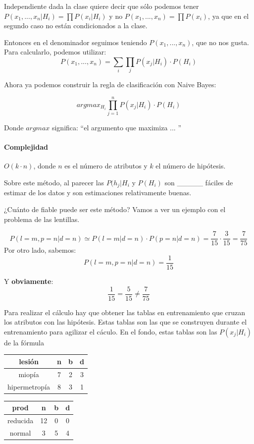 \documentclass{apuntes}
\begin{document}
Independiente dada la clase quiere decir que sólo podemos tener 
$P(x_1,...,x_n | H_i) = \prod{P(x_i | H_i)}$ y no $P(x_1,...,x_n) = \prod{P(x_i)}$, ya que en el segundo caso no están condicionados a la clase.

Entonces en el denominador seguimos teniendo $P(x_1,...,x_n)$, que no nos gusta. Para calcularlo, podemos utilizar: 
\[
P(x_1,...,x_n) = \sum_i \prod_j P(x_j | H_i) · P(H_i)
\]

Ahora ya podemos construir la regla de clasificación con Naive Bayes:

\begin{defn}
\begin{mdframed}
	\[
		argmax_{H_i} \prod_{j=1}^n P(x_j|H_i) · P(H_i)
	\]
\end{mdframed}
Donde $argmax$ significa: ``el argumento que maximiza ... ''

\paragraph{Complejidad} $O(k·n)$, donde $n$ es el número de atributos y $k$ el número de hipótesis.


Sobre este método, al parecer las $P(h_j|H_i$ y $P(H_i)$ son \_\_\_\_\_ fáciles de estimar de los datos y son estimaciones relativamente buenas.
\end{defn}

\begin{example}
¿Cuánto de fiable puede ser este método? Vamos a ver un ejemplo con el problema de las lentillas.

\[
P(l=m,p=n | d=n) \simeq P(l=m | d=n) · P(p=n | d=n) = \frac{7}{15}·\frac{3}{15} = \frac{7}{75} 
\]
Por otro lado, sabemos:
\[
P(l=m,p=n | d=n) = \frac{1}{15}
\]

Y \textbf{obviamente}: \[\frac{1}{15} = \frac{5}{15} ≠ \frac{7}{75}\]

\end{example}



Para realizar el cálculo hay que obtener las tablas en entrenamiento que cruzan los atributos con las hipótesis. Estas tablas son las que se construyen durante el entrenamiento para agilizar el cáculo. En el fondo, estas tablas son las $P(x_j|H_i)$ de la fórmula

\begin{center}

\begin{tabular}{|c|c|c|c|}
\hline
lesión & n&b&d\\\hline
miopía & 7&2&3\\\hline
hipermetropía & 8&3&1\\\hline
\end{tabular}
\;\;\;
\begin{tabular}{|c|c|c|c|}
\hline
prod & n&b&d\\\hline
reducida & 12 & 0 & 0\\\hline
normal &3&5&4\\\hline
\end{tabular}
\end{center}
\end{document}
